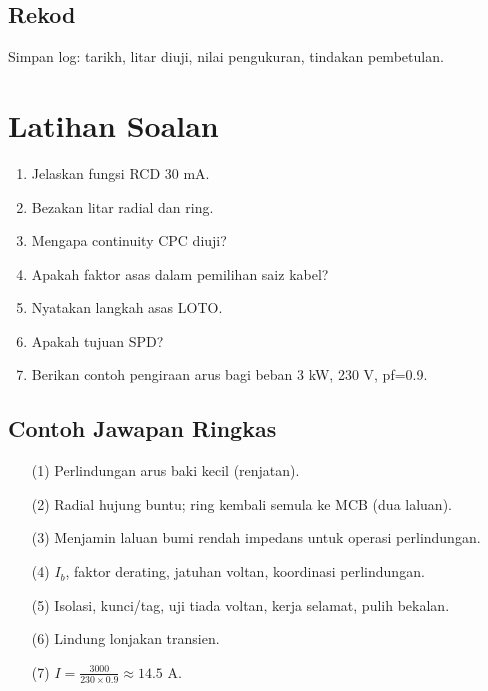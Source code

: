 \documentclass[12pt,a4paper,oneside]{scrreprt}
\begin{document}
\section{Rekod}
Simpan log: tarikh, litar diuji, nilai pengukuran, tindakan pembetulan.

\chapter{Latihan Soalan}
\begin{enumerate}
  \item Jelaskan fungsi RCD 30 mA.
  \item Bezakan litar radial dan ring.
  \item Mengapa continuity CPC diuji?
  \item Apakah faktor asas dalam pemilihan saiz kabel?
  \item Nyatakan langkah asas LOTO.
  \item Apakah tujuan SPD?
  \item Berikan contoh pengiraan arus bagi beban 3 kW, 230 V, pf=0.9.
\end{enumerate}

\section{Contoh Jawapan Ringkas}
\begin{itemize}
  \item[(1)] Perlindungan arus baki kecil (renjatan).
  \item[(2)] Radial hujung buntu; ring kembali semula ke MCB (dua laluan).
  \item[(3)] Menjamin laluan bumi rendah impedans untuk operasi perlindungan.
  \item[(4)] $I_b$, faktor derating, jatuhan voltan, koordinasi perlindungan.
  \item[(5)] Isolasi, kunci/tag, uji tiada voltan, kerja selamat, pulih bekalan.
  \item[(6)] Lindung lonjakan transien.
  \item[(7)] $I = \frac{3000}{230 \times 0.9} \approx 14.5$ A.
\end{itemize}

\end{document}
